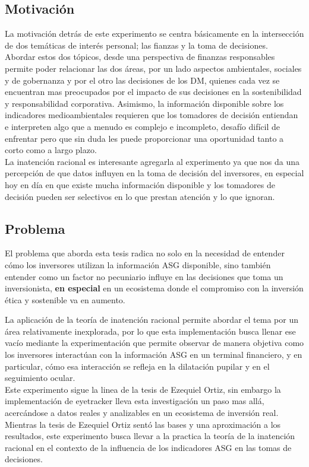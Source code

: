 \documentclass[11pt,letterpaper]{article}
\begin{document}
\subsection{Motivación}
La motivación detrás de este experimento se centra básicamente en la intersección de dos temáticas de interés personal; las fianzas y la toma de decisiones.\\
Abordar estos dos tópicos, desde una perspectiva de finanzas responsables permite poder relacionar las dos áreas, por un lado aspectos ambientales, sociales y de gobernanza y por el otro las decisiones de los DM, quienes cada vez se encuentran mas preocupados por el impacto de sus decisiones en la sostenibilidad y responsabilidad corporativa.
Asimismo, la información disponible sobre los indicadores medioambientales requieren que los tomadores de decisión entiendan e interpreten algo que a menudo es complejo e incompleto, desafío difícil de enfrentar pero que sin duda les puede proporcionar una oportunidad tanto a corto como a largo plazo.\\
La inatención racional es interesante agregarla al experimento ya que nos da una percepción de que datos influyen en la toma de decisión del inversores, en especial hoy en día en que existe mucha información disponible y los tomadores de decisión pueden ser selectivos en lo que prestan atención y lo que ignoran. 

\subsection{Problema}
El problema que aborda esta tesis radica no solo en la necesidad de entender cómo los inversores utilizan la información ASG disponible, sino también entender como un factor no pecuniario influye en las decisiones que toma un inversionista, \textbf{en especial} en un ecosistema donde el compromiso con la inversión ética y sostenible va en aumento. 

La aplicación de la teoría de inatención racional permite abordar el tema por un área relativamente inexplorada, por lo que esta implementación busca llenar ese vacío mediante la experimentación que permite observar de manera objetiva como los inversores interactúan con la información ASG en un terminal financiero, y en particular, cómo esa interacción se refleja en la dilatación pupilar y en el seguimiento ocular.\\

Este experimento sigue la linea de la tesis de Ezequiel Ortiz, sin embargo la implementación de eyetracker  lleva esta investigación un paso mas allá, acercándose a datos reales y analizables en un ecosistema de inversión real. Mientras la tesis de Ezequiel Ortiz sentó las bases y una aproximación a los resultados, este experimento busca llevar a la practica la teoría de la inatención racional en el contexto de la influencia de los indicadores ASG en las tomas de decisiones.
\end{document}
